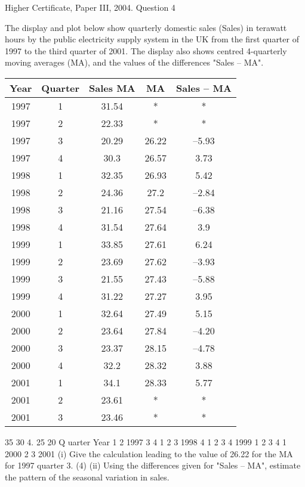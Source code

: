 \documentclass[a4paper,12pt]{article}
\begin{document}
Higher Certificate, Paper III, 2004.  Question 4 
 
\begin{framed}

The display and plot below show quarterly domestic sales (Sales) in terawatt hours by
the public electricity supply system in the UK from the first quarter of 1997 to the
third quarter of 2001. The display also shows centred 4-quarterly moving averages
(MA), and the values of the differences "Sales – MA".

\begin{center}
\begin{tabular}{ccccc}
Year	&	Quarter	&	Sales MA	&	MA	&	Sales – MA	\\ \hline
1997	&	1	&	31.54	&	*	&	*	\\ \hline
1997	&	2	&	22.33	&	*	&	*	\\ \hline
1997	&	3	&	20.29	&	26.22	&	–5.93	\\ \hline
1997	&	4	&	30.3	&	26.57	&	3.73	\\ \hline
1998	&	1	&	32.35	&	26.93	&	5.42	\\ \hline
1998	&	2	&	24.36	&	27.2	&	–2.84	\\ \hline
1998	&	3	&	21.16	&	27.54	&	–6.38	\\ \hline
1998	&	4	&	31.54	&	27.64	&	3.9	\\ \hline
1999	&	1	&	33.85	&	27.61	&	6.24	\\ \hline
1999	&	2	&	23.69	&	27.62	&	–3.93	\\ \hline
1999	&	3	&	21.55	&	27.43	&	–5.88	\\ \hline
1999	&	4	&	31.22	&	27.27	&	3.95	\\ \hline
2000	&	1	&	32.64	&	27.49	&	5.15	\\ \hline
2000	&	2	&	23.64	&	27.84	&	–4.20	\\ \hline
2000	&	3	&	23.37	&	28.15	&	–4.78	\\ \hline
2000	&	4	&	32.2	&	28.32	&	3.88	\\ \hline
2001	&	1	&	34.1	&	28.33	&	5.77	\\ \hline
2001	&	2	&	23.61	&	*	&	*	\\ \hline
2001	&	3	&	23.46	&	*	&	*	\\ \hline
\end{tabular}
\end{center}
35
30
4.
25
20
Q uarter
Year
1 2
1997
3 4 1 2 3
1998
4 1 2 3 4
1999
1 2 3 4 1
2000
2 3
2001
(i) Give the calculation leading to the value of 26.22 for the MA for 1997
quarter 3.
(4)
(ii) Using the differences given for "Sales – MA", estimate the pattern of the
seasonal variation in sales.
\end{framed}
\end{document}
